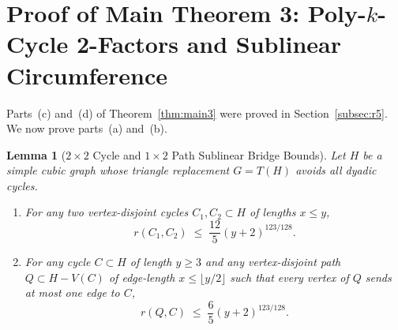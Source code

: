 \documentclass[11pt,reqno]{amsart}
\theoremstyle{plain}
\newtheorem{lemma}[theorem]{Lemma}
\theoremstyle{definition}
\theoremstyle{remark}
\DeclareRobustCommand{\_}{\ifmmode\text{\textunderscore}\else\textunderscore\allowbreak\fi}
\begin{document}
\section{Proof of Main Theorem 3: Poly-\texorpdfstring{$k$}{k}-Cycle 2-Factors and Sublinear Circumference}\label{sec:polyk}

Parts~(c) and~(d) of Theorem~\ref{thm:main3} were proved in Section~\ref{subsec:r5}. We now prove parts~(a) and~(b).

\begin{lemma}[$2 \times 2$ Cycle and $1 \times 2$ Path Sublinear Bridge Bounds]\label{lem:arc-decomp}
Let $H$ be a simple cubic graph whose triangle replacement $G = T(H)$ avoids all dyadic cycles.
\begin{enumerate}[label=(\roman*),leftmargin=2.2em]
  \item For any two vertex-disjoint cycles $C_1, C_2 \subset H$ of lengths $x \le y$,
  \[
    r(C_1, C_2) \;\le\; \frac{12}{5}(y + 2)^{123/128}.
  \]
  \item For any cycle $C \subset H$ of length $y \ge 3$ and any vertex-disjoint path $Q \subset H - V(C)$ of edge-length $x \le \lfloor y/2 \rfloor$ such that every vertex of $Q$ sends at most one edge to $C$,
  \[
    r(Q, C) \;\le\; \frac{6}{5}(y + 2)^{123/128}.
  \]
\end{enumerate}
\end{lemma}
\end{document}
